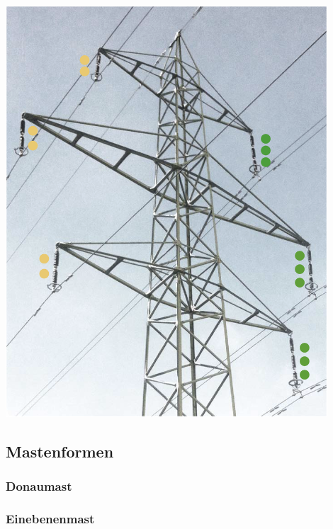 \begin{minipage}[c]{0.48\columnwidth}
    \begin{center}
        \includegraphics[width=0.9\textwidth, align=c]{images/Freileitungen_2.png}
    \end{center}
\end{minipage}

\subsection{Mastenformen}

\begin{minipage}[c]{0.4\columnwidth}
    \subsubsection{Donaumast}
\end{minipage}
\hfill
\begin{minipage}[c]{0.56\columnwidth}
    \subsubsection{Einebenenmast}
\end{minipage}

